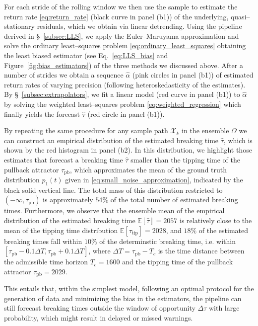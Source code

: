 \documentclass[openacc]{rsproca_new}
\newcommand{\E}{\mathbb{E}}
\begin{document}
For each stride of the rolling window we then use the sample to estimate the return rate \eqref{eq:return_rate} (black curve in panel (b1)) of the underlying, quasi--stationary residuals, which we obtain via linear detrending.
Using the pipeline derived in \S~\ref{subsec:LLS}, we apply the Euler--Maruyama approximation and solve the ordinary least--squares problem \eqref{eq:ordinary_least_squares} obtaining the least biased estimator (see Eq.~\eqref{eq:LLS_bias} and Figure~\ref{fig:bias_estimators}) of the three methods we discussed above.
After a number of strides we obtain a sequence $\hat\alpha$ (pink circles in panel (b1)) of estimated return rates of varying precision (following heteroskedasticity of the estimates).
By \S~\ref{subsec:extrapolators}, we fit a linear model (red curve in panel (b1)) to $\hat\alpha$ by solving the weighted least--squares problem \eqref{eq:weighted_regression} which finally yields the forecast $\hat\tau$ (red circle in panel (b1)).

By repeating the same procedure for any sample path $\mathcal{X}_k$ in the ensemble $\Omega$ we can construct an empirical distribution of the estimated breaking time $\hat\tau$, which is shown by the red histogram in panel (b2).
In this distribution, we highlight those estimates that forecast a breaking time $\hat\tau$ smaller than the tipping time of the pullback attractor $\tau_{\mathrm{pb}}$, which approximates the mean of the ground truth distribution $p_1(t)$ given in \eqref{eq:small_noise_approximation}, indicated by the black solid vertical line.
The total mass of this distribution restricted to $(-\infty,\tau_{\mathrm{pb}})$ is approximately $54\%$ of the total number of estimated breaking times.
Furthermore, we observe that the ensemble mean of the empirical distribution of the estimated breaking time $\E[\hat\tau] = 2057$ is relatively close to the mean of the tipping time distribution $\E[\tau_{\mathrm{tip}}] = 2028$, and $18\%$ of the estimated breaking times fall within $10\%$ of the determinstic breaking time, i.e. within $[\tau_{\mathrm{pb}} - 0.1\Delta T, \tau_{\mathrm{pb}} + 0.1\Delta T]$, where $\Delta T = \tau_{\mathrm{pb}} - T_c$ is the time distance between the admissible time horizon $T_c = 1600$ and the tipping time of the pullback attractor $\tau_{\mathrm{pb}}=2029$.

This entails that, within the simplest model, following an optimal protocol for the generation of data and minimizing the bias in the estimators, the pipeline can still forecast breaking times outside the window of opportunity $\Delta\tau$ with large probability, which might result in delayed or missed warnings.
\end{document}
